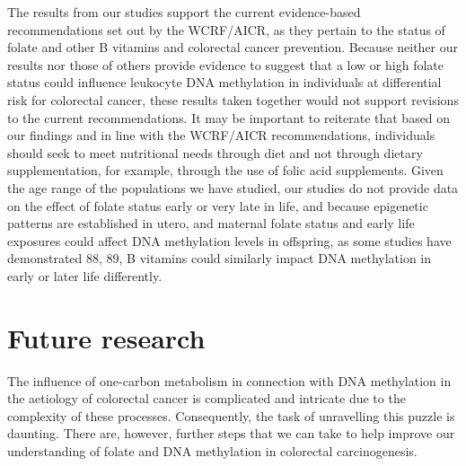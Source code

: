\noindent The results from our studies support the current evidence-based recommendations set out by the WCRF/AICR, as they pertain to the status of folate and other B vitamins and colorectal cancer prevention. Because neither our results nor those of others provide evidence to suggest that a low or high folate status could influence leukocyte DNA methylation in individuals at differential risk for colorectal cancer, these results taken together would not support revisions to the current recommendations. It may be important to reiterate that based on our findings and in line with the WCRF/AICR recommendations, individuals should seek to meet nutritional needs through diet and not through dietary supplementation, for example, through the use of folic acid supplements. Given the age range of the populations we have studied, our studies do not provide data on the effect of folate status early or very late in life, and because epigenetic patterns are established in utero, and maternal folate status and early 
life exposures could affect DNA methylation levels in offspring, as some studies have demonstrated 88, 89, B vitamins could similarly impact DNA methylation in early or later life differently. 
 
\section[]{Future research} %
The influence of one-carbon metabolism in connection with DNA methylation in the aetiology of colorectal cancer is complicated and intricate due to the complexity of these processes. Consequently, the task of unravelling this puzzle is daunting. There are, however, further steps that we can take to help improve our understanding of folate and DNA methylation in colorectal carcinogenesis. 
 
